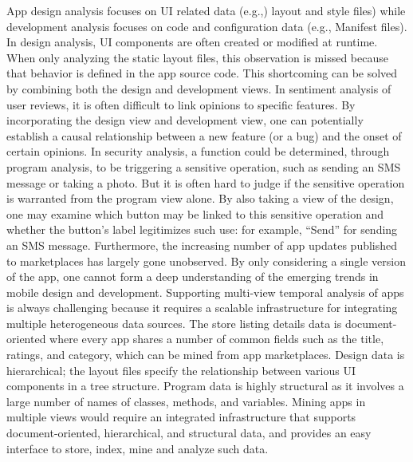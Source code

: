 App design analysis focuses on UI related data (e.g.,) layout and style files) while development analysis focuses on code and configuration data (e.g., Manifest files).
In design analysis, UI components are often created or modified at runtime.
When only analyzing the static layout files, this observation is missed because that behavior is defined in the app source code.
This shortcoming can be solved by combining both the design and development views.
In sentiment analysis of user reviews, it is often difficult to link opinions to specific features.
By incorporating the design view and development view, one can potentially establish a causal relationship between a new feature (or a bug) and the onset of certain opinions.
In security analysis, a function could be determined, through program analysis, to be triggering a sensitive operation, such as sending an SMS message or taking a photo.
But it is often hard to judge if the sensitive operation is warranted from the program view alone.
By also taking a view of the design, one may examine which button may be linked to this sensitive operation and whether the button's label legitimizes such use: for example, ``Send'' for sending an SMS message.
Furthermore, the increasing number of app updates published to marketplaces has largely gone unobserved. 
By only considering a single version of the app, one cannot form a deep understanding of the emerging trends in mobile design and development.
Supporting multi-view temporal analysis of apps is always challenging because it requires a scalable infrastructure for integrating multiple heterogeneous data sources.
The store listing details data is document-oriented where every app shares a number of common fields such as the title, ratings, and category, which can be mined from app marketplaces.
Design data is hierarchical; the layout files specify the relationship between various UI components in a tree structure.
Program data is highly structural as it involves a large number of names of classes, methods, and variables.
Mining apps in multiple views would require an integrated infrastructure that supports document-oriented, hierarchical, and structural data, and provides an easy interface to store, index, mine and analyze such data.

